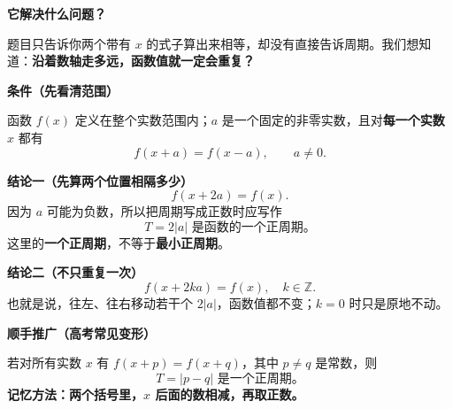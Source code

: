 \begin{statementbox}


\textbf{\textcolor{CStatement}{它解决什么问题？}}

题目只告诉你两个带有 $x$ 的式子算出来相等，却没有直接告诉周期。我们想知道：\textbf{沿着数轴走多远，函数值就一定会重复？}

\medskip
\textbf{\textcolor{CStatement}{条件（先看清范围）}}

函数 $f(x)$ 定义在整个实数范围内；$a$ 是一个固定的非零实数，且对\textbf{每一个实数} $x$ 都有
\[
\boxed{f(x+a)=f(x-a),\qquad a\ne0.}
\]

\textbf{\textcolor{CStatement}{结论一（先算两个位置相隔多少）}}
\[
\boxed{f(x+2a)=f(x).}
\]
因为 $a$ 可能为负数，所以把周期写成正数时应写作
\[
\boxed{T=2|a|\text{ 是函数的一个正周期。}}
\]
这里的\textbf{一个正周期}，不等于\textbf{最小正周期}。

\medskip
\end{statementbox}\clearpage\begin{statementbox}\textbf{\textcolor{CStatement}{结论二（不只重复一次）}}
\[
\boxed{f(x+2ka)=f(x),\quad k\in\mathbb Z.}
\]
也就是说，往左、往右移动若干个 $2|a|$，函数值都不变；$k=0$ 时只是原地不动。

\medskip
\textbf{\textcolor{CStatement}{顺手推广（高考常见变形）}}

若对所有实数 $x$ 有 $f(x+p)=f(x+q)$，其中 $p\ne q$ 是常数，则
\[
\boxed{T=|p-q|\text{ 是一个正周期。}}
\]
\textbf{记忆方法：两个括号里，$x$ 后面的数相减，再取正数。}
\end{statementbox}

